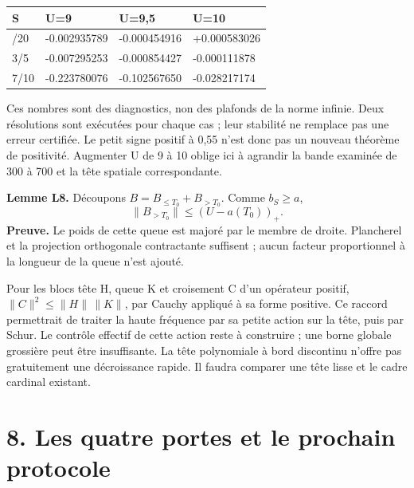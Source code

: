 \documentclass[
  10pt,
  a4paper,
]{article}
\begin{document}
\begin{longtable}[]{@{}llll@{}}
\toprule\noalign{}
S & U=9 & U=9,5 & U=10 \\
\midrule\noalign{}
\endhead
\bottomrule\noalign{}
\endlastfoot
11/20 & -0.002935789 & -0.000454916 & +0.000583026 \\
3/5 & -0.007295253 & -0.000854427 & -0.000111878 \\
7/10 & -0.223780076 & -0.102567650 & -0.028217174 \\
\end{longtable}

Ces nombres sont des diagnostics, non des plafonds de la norme infinie.
Deux résolutions sont exécutées pour chaque cas ; leur stabilité ne
remplace pas une erreur certifiée. Le petit signe positif à 0,55 n'est
donc pas un nouveau théorème de positivité. Augmenter U de 9 à 10 oblige
ici à agrandir la bande examinée de 300 à 700 et la tête spatiale
correspondante.

\textbf{Lemme L8.} Découpons \(B=B_{\le T_0}+B_{>T_0}\). Comme
\(b_S\ge a\), \[
\|B_{>T_0}\|\le(U-a(T_0))_+.
\] \textbf{Preuve.} Le poids de cette queue est majoré par le membre de
droite. Plancherel et la projection orthogonale contractante suffisent ;
aucun facteur proportionnel à la longueur de la queue n'est ajouté.

Pour les blocs tête H, queue K et croisement C d'un opérateur positif,
\(\|C\|^2\le\|H\|\,\|K\|\), par Cauchy appliqué à sa forme positive. Ce
raccord permettrait de traiter la haute fréquence par sa petite action
sur la tête, puis par Schur. Le contrôle effectif de cette action reste
à construire ; une borne globale grossière peut être insuffisante. La
tête polynomiale à bord discontinu n'offre pas gratuitement une
décroissance rapide. Il faudra comparer une tête lisse et le cadre
cardinal existant.

\hypertarget{les-quatre-portes-et-le-prochain-protocole}{%
\section{8. Les quatre portes et le prochain
protocole}\label{les-quatre-portes-et-le-prochain-protocole}}
\end{document}
